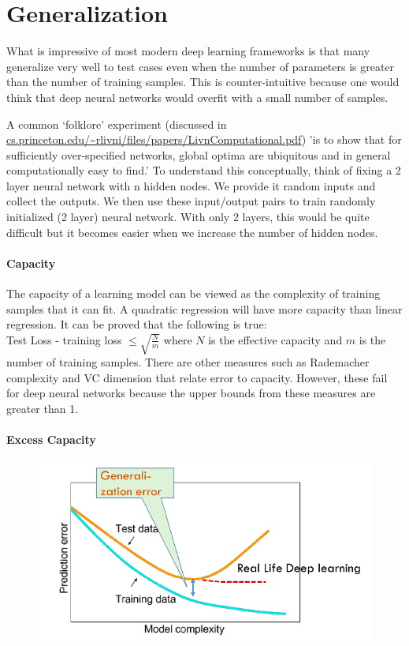 \section{Generalization}
What is impressive of most modern deep learning frameworks is that many generalize very well to test cases even when the number of parameters is greater than the number of training samples. This is counter-intuitive because one would think that deep neural networks would overfit with a small number of samples.

A common `folklore' experiment (discussed in \url{cs.princeton.edu/~rlivni/files/papers/LivnComputational.pdf}) 'is to show that for sufficiently over-specified networks, global optima are ubiquitous and in general computationally easy to find.' To understand this conceptually, think of fixing a 2 layer neural network with n hidden nodes. We provide it random inputs and collect the outputs. We then use these input/output pairs to train randomly initialized (2 layer) neural network. With only 2 layers, this would be quite difficult but it becomes easier when we increase the number of hidden nodes.

\paragraph{Capacity}
The capacity of a learning model can be viewed as the complexity of training samples that it can fit. A quadratic regression will have more capacity than linear regression. It can be proved that the following is true:\\

Test Loss - training loss $\leq \sqrt{\frac{N}{m}}$ where $N$ is the effective capacity and $m$ is the number of training samples. There are other measures such as Rademacher complexity and VC dimension that relate error to capacity. However, these fail for deep neural networks because the upper bounds from these measures are greater than 1. 

\paragraph{Excess Capacity}
\begin{figure}
\includegraphics[width=1\textwidth]{capacity}
\end{figure}

